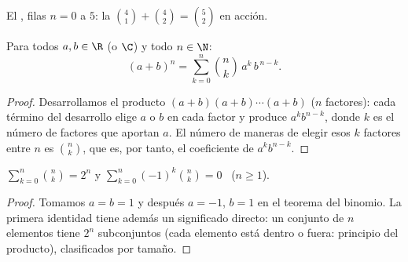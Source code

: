 \begin{omfigure}

{\small El , filas $n = 0$ a $5$: la 
$\binom{4}{1} + \binom{4}{2} = \binom{5}{2}$ en acción.}
\end{omfigure}

\begin{theorem}\label{thm:g12:comb:binomial}
Para todos $a, b \in \R$ (o $\C$) y todo $n \in \N$:
\[
(a+b)^n = \sum_{k=0}^{n} \binom{n}{k}\, a^{k}\, b^{\,n-k} .
\]
\end{theorem}

\begin{proof}
Desarrollamos el producto $(a+b)(a+b)\cdots(a+b)$ ($n$ factores): cada
término del desarrollo elige $a$ o $b$ en cada factor y produce
$a^k b^{n-k}$, donde $k$ es el número de factores que aportan $a$. El número
de maneras de elegir esos $k$ factores entre $n$ es $\binom nk$, que es, por
tanto, el coeficiente de $a^k b^{n-k}$.
\end{proof}

\begin{corollary}\label{cor:g12:comb:sums}
$\displaystyle\sum_{k=0}^{n} \binom{n}{k} = 2^n$
\quad y \quad
$\displaystyle\sum_{k=0}^{n} (-1)^k\binom{n}{k} = 0$ \ ($n \geq 1$).
\end{corollary}

\begin{proof}
Tomamos $a = b = 1$ y después $a = -1$, $b = 1$ en el teorema del binomio.
La primera identidad tiene además un significado directo: un conjunto de $n$
elementos tiene $2^n$ subconjuntos (cada elemento está dentro o fuera:
principio del producto), clasificados por tamaño.
\end{proof}

